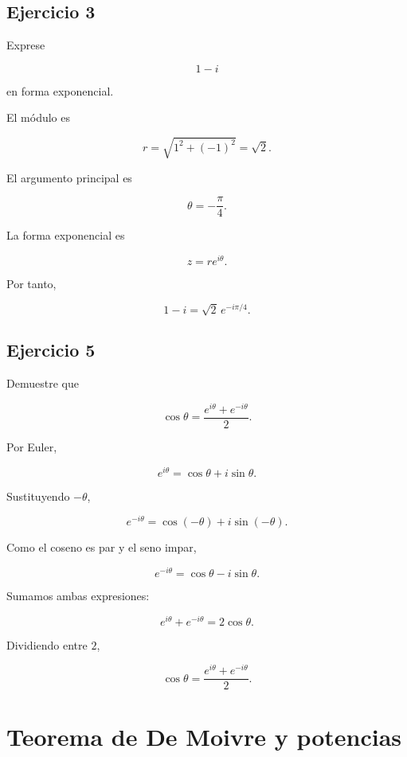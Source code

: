 \documentclass[12pt]{article}
\begin{document}

\subsection*{Ejercicio 3}

Exprese

\[
1-i
\]

en forma exponencial.

El módulo es

\[
r
=
\sqrt{1^2+(-1)^2}
=
\sqrt2.
\]

El argumento principal es

\[
\theta=-\frac{\pi}{4}.
\]

La forma exponencial es

\[
z=re^{i\theta}.
\]

Por tanto,

\[
\boxed{
1-i
=
\sqrt2\,e^{-i\pi/4}
}.
\]


\subsection*{Ejercicio 5}

Demuestre que

\[
\cos\theta
=
\frac{e^{i\theta}+e^{-i\theta}}{2}.
\]

Por Euler,

\[
e^{i\theta}
=
\cos\theta+i\sin\theta.
\]

Sustituyendo \(-\theta\),

\[
e^{-i\theta}
=
\cos(-\theta)+i\sin(-\theta).
\]

Como el coseno es par y el seno impar,

\[
e^{-i\theta}
=
\cos\theta-i\sin\theta.
\]

Sumamos ambas expresiones:

\[
e^{i\theta}+e^{-i\theta}
=
2\cos\theta.
\]

Dividiendo entre \(2\),

\[
\boxed{
\cos\theta
=
\frac{e^{i\theta}+e^{-i\theta}}{2}
}.
\]

\section*{Teorema de De Moivre y potencias}
\end{document}
